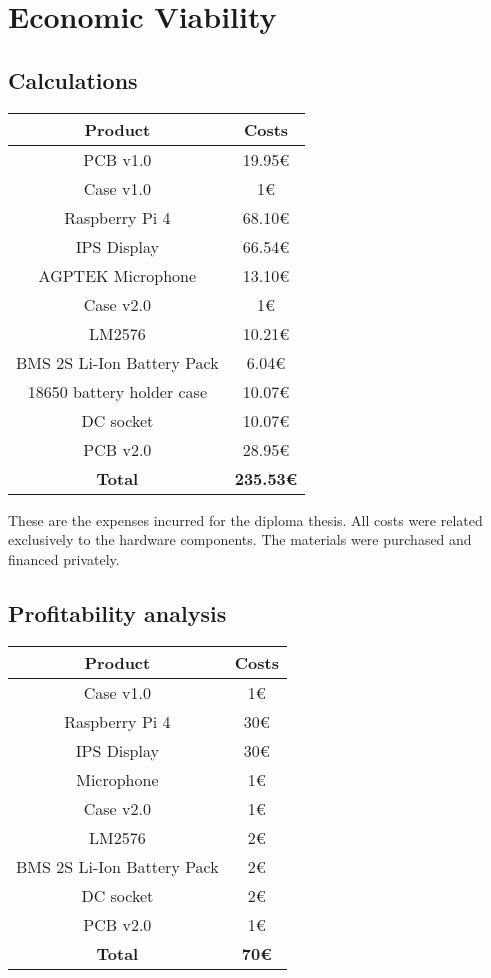 \renewcommand*\chapterpagestyle{scrheadings}
\chapter{Economic Viability}

\section{Calculations}

\begin{tabular}{|c|c|}
  \hline
  \textbf{Product} & \textbf{Costs} \\ \hline
  PCB v1.0 & 19.95€ \\ \hline
  Case v1.0 & 1€ \\ \hline
  Raspberry Pi 4 & 68.10€ \\ \hline
  IPS Display & 66.54€ \\ \hline
  AGPTEK Microphone & 13.10€ \\ \hline
  Case v2.0 & 1€ \\ \hline
  LM2576 & 10.21€ \\ \hline
  BMS 2S Li-Ion Battery Pack & 6.04€ \\ \hline
  18650 battery holder case & 10.07€ \\ \hline
  DC socket & 10.07€ \\ \hline
  PCB v2.0 & 28.95€ \\ \hline
  \textbf{Total} & \textbf{235.53€} \\ \hline

\end{tabular}

\vspace{0.5cm}
These are the expenses incurred for the diploma thesis. All costs were related exclusively to the hardware components. The materials were purchased and financed privately.


\section{Profitability analysis}

\begin{tabular}{|c|c|}
  \hline
  \textbf{Product} & \textbf{Costs} \\ \hline
  Case v1.0 & 1€ \\ \hline
  Raspberry Pi 4 & 30€ \\ \hline
  IPS Display & 30€ \\ \hline
  Microphone & 1€ \\ \hline
  Case v2.0 & 1€ \\ \hline
  LM2576 & 2€ \\ \hline
  BMS 2S Li-Ion Battery Pack & 2€ \\ \hline
  DC socket & 2€ \\ \hline
  PCB v2.0 & 1€ \\ \hline
  \textbf{Total} & \textbf{70€} \\ \hline

\end{tabular}

